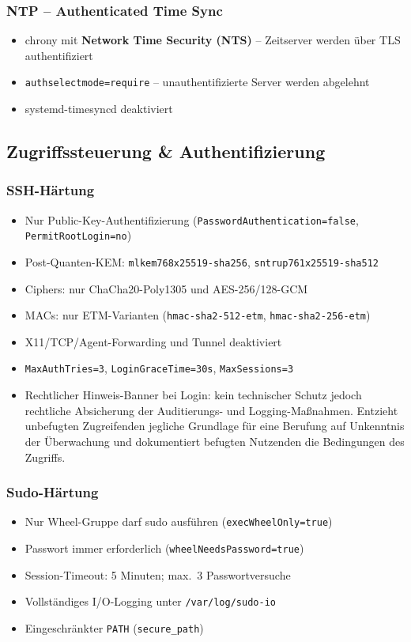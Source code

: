 \subsubsection*{NTP -- Authenticated Time Sync}
\begin{itemize}
  \item chrony mit \textbf{Network Time Security (NTS)} -- Zeitserver werden über TLS authentifiziert
  \item \texttt{authselectmode=require} -- unauthentifizierte Server werden abgelehnt
  \item systemd-timesyncd deaktiviert
\end{itemize}


\subsection{Zugriffssteuerung \& Authentifizierung}
\subsubsection*{SSH-Härtung}
\begin{itemize}
  \item Nur Public-Key-Authentifizierung (\texttt{PasswordAuthentication=false}, \texttt{PermitRootLogin=no})
  \item Post-Quanten-KEM: \texttt{mlkem768x25519-sha256}, \texttt{sntrup761x25519-sha512}
  \item Ciphers: nur ChaCha20-Poly1305 und AES-256/128-GCM
  \item MACs: nur ETM-Varianten (\texttt{hmac-sha2-512-etm}, \texttt{hmac-sha2-256-etm})
  \item X11/TCP/Agent-Forwarding und Tunnel deaktiviert
  \item \texttt{MaxAuthTries=3}, \texttt{LoginGraceTime=30s}, \texttt{MaxSessions=3}
  \item Rechtlicher Hinweis-Banner bei Login: kein technischer Schutz jedoch rechtliche Absicherung der Auditierungs- und Logging-Maßnahmen. Entzieht
  unbefugten Zugreifenden jegliche Grundlage für eine Berufung auf Unkenntnis der Überwachung und
  dokumentiert befugten Nutzenden die Bedingungen des Zugriffs.
\end{itemize}

\subsubsection*{Sudo-Härtung}
\begin{itemize}
  \item Nur Wheel-Gruppe darf sudo ausführen (\texttt{execWheelOnly=true})
  \item Passwort immer erforderlich (\texttt{wheelNeedsPassword=true})
  \item Session-Timeout: 5 Minuten; max.\ 3 Passwortversuche
  \item Vollständiges I/O-Logging unter \texttt{/var/log/sudo-io}
  \item Eingeschränkter \texttt{PATH} (\texttt{secure\_path})
\end{itemize}

